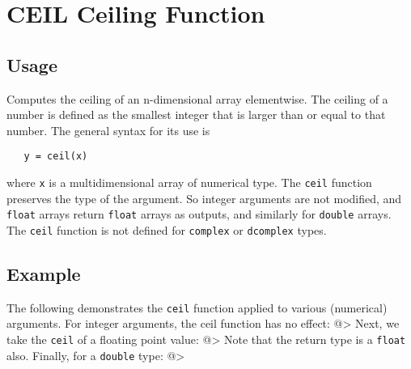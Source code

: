 \section{CEIL Ceiling Function}

\subsection{Usage}

Computes the ceiling of an n-dimensional array elementwise.  The
ceiling of a number is defined as the smallest integer that is
larger than or equal to that number. The general syntax for its use
is
\begin{verbatim}
   y = ceil(x)
\end{verbatim}
where \verb|x| is a multidimensional array of numerical type.  The \verb|ceil| 
function preserves the type of the argument.  So integer arguments 
are not modified, and \verb|float| arrays return \verb|float| arrays as 
outputs, and similarly for \verb|double| arrays.  The \verb|ceil| function 
is not defined for \verb|complex| or \verb|dcomplex| types.
\subsection{Example}

The following demonstrates the \verb|ceil| function applied to various
(numerical) arguments.  For integer arguments, the ceil function has
no effect:
@>
Next, we take the \verb|ceil| of a floating point value:
@>
Note that the return type is a \verb|float| also.  Finally, for a \verb|double|
type:
@>

